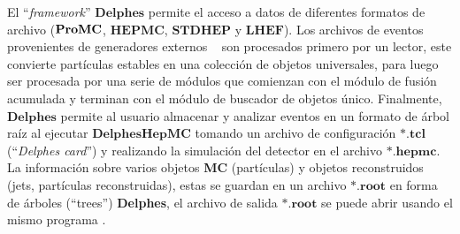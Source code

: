 El ``\textit{framework}'' $\mathbf{Delphes}$ permite el acceso a datos de diferentes formatos de archivo ($\mathbf{Pro}\-\mathbf{MC}$, $\mathbf{HEPMC}$, $\mathbf{STDHEP}$ y $\mathbf{LHEF}$). Los archivos de eventos provenientes de generadores externos \MC ~ son procesados primero por un lector, este convierte partículas estables en una colección de objetos universales, para luego ser procesada por una serie de módulos que comienzan con el módulo de fusión acumulada y terminan con el módulo de buscador de objetos único. Finalmente,  $\mathbf{Delphes}$ permite al usuario almacenar y analizar eventos en un formato de árbol raíz al ejecutar  $\mathbf{DelphesHepMC}$ tomando un archivo de configuración $\mathbf{*.tcl}$(``\textit{Delphes card}'') y realizando la simulación del detector en el archivo $\mathbf{*.hepmc}$. La información sobre varios objetos \textbf{MC} (partículas) y objetos reconstruidos (jets, partículas reconstruidas), estas se guardan en un archivo $\mathbf{*.root}$ en forma de árboles (``trees'')  \textbf{Delphes}, el archivo de salida $\mathbf{*.root}$ se puede abrir usando el mismo programa \ROOT.




















